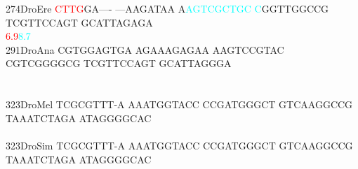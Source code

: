 \documentclass[11pt,twoside,reqno,a4paper]{article}
\begin{document}
{274\hspace*{1\charwidth}DroEre	\textcolor{red}{C}\textcolor{red}{T}\textcolor{red}{T}\textcolor{red}{G}GA----	---AAGATAA	A\textcolor{cyan}{A}\textcolor{cyan}{G}\textcolor{cyan}{T}\textcolor{cyan}{C}\textcolor{cyan}{G}\textcolor{cyan}{C}\textcolor{cyan}{T}\textcolor{cyan}{G}\textcolor{cyan}{C}	\textcolor{cyan}{C}GGTTGGCCG	TCGTTCCAGT	GCATTAGAGA	\\
\hspace*{4\charwidth}\hspace*{7\charwidth}\hspace*{0\charwidth}\textcolor{red}{6.9}\hspace*{1\charwidth}\hspace*{1\charwidth}\hspace*{18\charwidth}\textcolor{cyan}{8.7}\hspace*{1\charwidth}\hspace*{1\charwidth}\hspace*{1\charwidth}\hspace*{1\charwidth}\\
291\hspace*{1\charwidth}DroAna	CGTGGAGTGA	AGAAAGAGAA	AAGTCCGTAC	CGTCGGGGCG	TCGTTCCAGT	GCATTAGGGA	\\
\hspace*{4\charwidth}\hspace*{7\charwidth}\hspace*{1\charwidth}\hspace*{1\charwidth}\hspace*{1\charwidth}\hspace*{1\charwidth}\hspace*{1\charwidth}\hspace*{1\charwidth}\\
\\
323\hspace*{1\charwidth}DroMel	TCGCGTTT-A	AAATGGTACC	CCGATGGGCT	GTCAAGGCCG	TAAATCTAGA	ATAGGGGCAC	\\
\hspace*{4\charwidth}\hspace*{7\charwidth}\hspace*{1\charwidth}\hspace*{1\charwidth}\hspace*{1\charwidth}\hspace*{1\charwidth}\hspace*{1\charwidth}\hspace*{1\charwidth}\\
323\hspace*{1\charwidth}DroSim	TCGCGTTT-A	AAATGGTACC	CCGATGGGCT	GTCAAGGCCG	TAAATCTAGA	ATAGGGGCAC	\\
}
\end{document}

